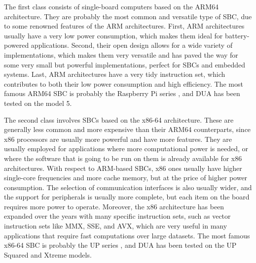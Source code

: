 The first class consists of single-board computers based on the ARM64 architecture. They are probably the most common and versatile type of SBC, due to some renowned features of the ARM architectures. First, ARM architectures usually have a very low power consumption, which makes them ideal for battery-powered applications. Second, their open design allows for a wide variety of implementations, which makes them very versatile and has paved the way for some very small but powerful implementations, perfect for SBCs and embedded systems. Last, ARM architectures have a very tidy instruction set, which contributes to both their low power consumption and high efficiency. The most famous ARM64 SBC is probably the Raspberry Pi series \cite{raspberry_pi_ltd_raspberry_nodate}, and DUA has been tested on the model 5.

The second class involves SBCs based on the x86-64 architecture. These are generally less common and more expensive than their ARM64 counterparts, since x86 processors are usually more powerful and have more features. They are usually employed for applications where more computational power is needed, or where the software that is going to be run on them is already available for x86 architectures. With respect to ARM-based SBCs, x86 ones usually have higher single-core frequencies and more cache memory, but at the price of higher power consumption. The selection of communication interfaces is also usually wider, and the support for peripherals is usually more complete, but each item on the board requires more power to operate. Moreover, the x86 architecture has been expanded over the years with many specific instruction sets, such as vector instruction sets like MMX, SSE, and AVX, which are very useful in many applications that require fast computations over large datasets. The most famous x86-64 SBC is probably the UP series \cite{aaeon_technology_up_nodate}, and DUA has been tested on the UP Squared and Xtreme models.

